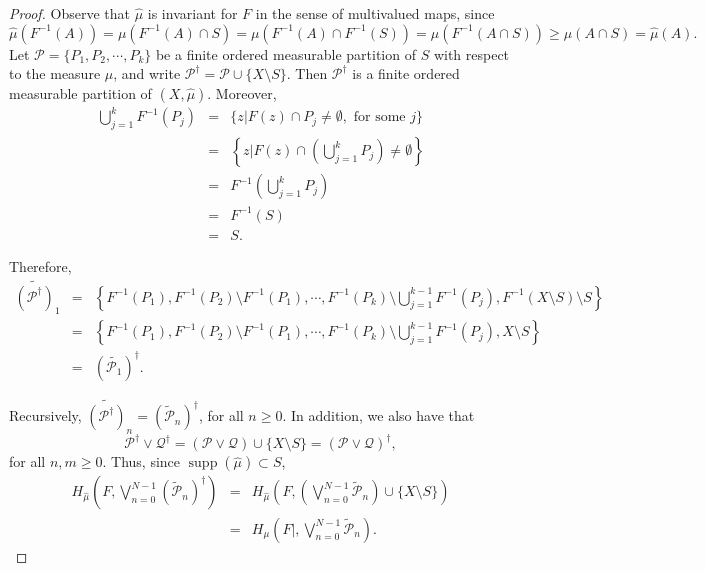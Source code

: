 \documentclass[11pt,letterpaper]{article}
\theoremstyle{definition}
\def\supp{\operatorname{supp}}
\begin{document}
\begin{proof}
Observe that $\hat{\mu}$ is invariant for $F$ in the sense of multivalued maps, since
$$\hat{\mu}(F^{-1}(A))=\mu(F^{-1}(A)\cap S)=\mu(F^{-1}(A)\cap F^{-1}(S))=\mu(F^{-1}(A\cap S))\geq\mu(A\cap S)=\hat{\mu}(A).$$
Let $\mathcal{P}=\lbrace P_1,P_2,\cdots,P_k\rbrace$ be a finite ordered measurable partition of $S$ with respect to the measure $\mu$, and write $\mathcal{P}^\dagger=\mathcal{P}\cup\lbrace X\setminus S\rbrace$. Then $\mathcal{P}^\dagger$ is a finite ordered measurable partition of $(X,\hat{\mu})$. Moreover,
\begin{eqnarray*}
\bigcup\limits_{j=1}^k F^{-1}(P_j)&=&\lbrace z|F(z)\cap P_j\neq\emptyset,\mbox{ for some }j\rbrace\\
&=&\left\lbrace z\Big|F(z)\cap\left(\bigcup\limits_{j=1}^k P_j\right)\neq\emptyset\right\rbrace\\
&=&F^{-1}\left(\bigcup\limits_{j=1}^k P_j\right)\\
&=&F^{-1}(S)\\
&=&S.
\end{eqnarray*}

Therefore,
\begin{eqnarray*}
\widetilde{(\mathcal{P}^\dagger)}_1&=&\left\lbrace F^{-1}(P_1),F^{-1}(P_2)\setminus F^{-1}(P_1),\cdots, F^{-1}(P_k)\setminus\bigcup\limits_{j=1}^{k-1} F^{-1}(P_j), F^{-1}(X\setminus S)\setminus S\right\rbrace\\
&=&\left\lbrace F^{-1}(P_1),F^{-1}(P_2)\setminus F^{-1}(P_1),\cdots,F^{-1}(P_k)\setminus\bigcup\limits_{j=1}^{k-1} F^{-1}(P_j),X\setminus S\right\rbrace\\
&=&(\widetilde{\mathcal{P}_1})^\dagger.
\end{eqnarray*}

Recursively, $\widetilde{(\mathcal{P}^\dagger)}_n=(\widetilde{\mathcal{P}}_n)^\dagger$, for all $n\geq 0$. In addition, we also have that
$$\mathcal{P}^\dagger\vee\mathcal{Q}^\dagger=\left(\mathcal{P}\vee\mathcal{Q}\right)\cup\lbrace X\setminus S\rbrace=(\mathcal{P}\vee\mathcal{Q})^\dagger,$$
for all $n,m\geq 0$. Thus, since $\supp(\hat{\mu})\subset S$,
\begin{eqnarray*}
H_{\hat{\mu}}\left(F,\bigvee\limits_{n=0}^{N-1}(\widetilde{\mathcal{P}}_n)^\dagger\right)&=&H_{\hat{\mu}}\left(F,\left(\bigvee\limits_{n=0}^{N-1}\widetilde{\mathcal{P}}_n\right)\cup\lbrace X\setminus S\rbrace\right)\\
&=&H_{\mu}\left(F|,\bigvee\limits_{n=0}^{N-1}\widetilde{\mathcal{P}}_n\right).
\end{eqnarray*}


\end{proof}
\end{document}

